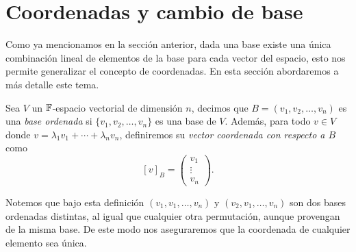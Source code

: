 \section{Coordenadas y cambio de base}

Como ya mencionamos en la sección anterior, dada una base existe una única combinación lineal de elementos de la base para cada vector del espacio, esto nos permite generalizar el concepto de coordenadas. En esta sección abordaremos a más detalle este tema.


\begin{defi}
  Sea $V$ un $\mathbb{F}$-espacio vectorial de dimensión $n$, decimos que $B = (v_1, v_2, \ldots, v_n)$ es una \emph{base ordenada} si $\{v_1, v_2, \ldots, v_n\}$ es una base de $V$. Además, para todo $v \in V$ donde $v = \lambda_1 v_1 + \cdots + \lambda_n v_n$, definiremos su \emph{vector coordenada con respecto a $B$} como
    \[ [v]_B = \begin{pmatrix}
      v_1 \\ \vdots \\ v_n
    \end{pmatrix}.\]
\end{defi}

Notemos que bajo esta definición $(v_1, v_1, \ldots, v_n)$ y $(v_2, v_1, \ldots, v_n)$ son dos bases ordenadas distintas, al igual que cualquier otra permutación, aunque provengan de la misma base. De este modo nos aseguraremos que la coordenada de cualquier elemento sea única.

